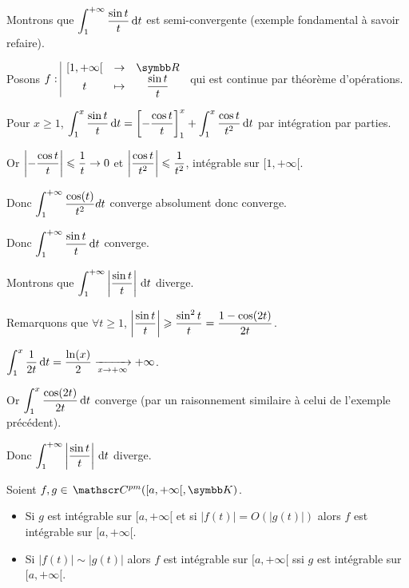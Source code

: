 \begin{exemple}
    Montrons que $\displaystyle \int_{1 }^{+ \infty   } \frac{\sin t }{t } \,\mathrm{d}t$ est semi-convergente (exemple fondamental à savoir refaire). 


    Posons $\fonction f {[1, + \infty[}{\R}{t}{\frac{\sin t}{t}}$ qui est continue par théorème d'opérations.

    Pour $x \geqslant 1$, $\displaystyle \int_{1 }^{x } \frac{\sin t}{t} \,\mathrm{d}t = \left[ - \frac{\cos t}{t} \right]_1^x + \int_1^x \frac{\cos t}{t^2} \,\mathrm{d}t$
    par intégration par parties.

    Or $\displaystyle \left| -\frac{\cos t}{t} \right| \leqslant \frac{1}{t} \to 0$ 
    et $\displaystyle \left| \frac{\cos t}{t^2} \right| \leqslant \frac{1}{t^2}$, intégrable sur $[1, + \infty[$.

    Donc $\displaystyle \int_1^{+\infty} \frac{\cos(t)}{t^2} dt$ converge absolument donc converge.

    Donc $\displaystyle \int_{1 }^{+ \infty   } \frac{\sin t }{t } \,\mathrm{d}t$ converge.


    Montrons que $\displaystyle \int_{1 }^{+ \infty   } \left| \frac{\sin t }{t } \right| \,\mathrm{d}t$ diverge.

    Remarquons que $\forall t \geqslant 1$, $\displaystyle \left| \frac{\sin t}{t} \right| \geqslant \frac{\sin^2 t}{t} = \frac{1 - \cos(2t)}{2t}$.

    $\displaystyle \int_{1}^{x } \frac 1 {2t} \,\mathrm{d}t = \frac{\ln(x)}{2} \xrightarrow[x \to + \infty   ]{} + \infty$.

    Or $\displaystyle \int_{1}^{x } \frac{\cos(2t)}{2t} \,\mathrm{d}t$ converge (par un raisonnement similaire à celui de l'exemple précédent).

    Donc $\displaystyle \int_{1 }^{+ \infty   } \left| \frac{\sin t }{t } \right| \,\mathrm{d}t$ diverge.
\end{exemple}



\begin{theoreme}{}{}
    Soient $f, g \in \mc{pm}([a, + \infty[, \K)$. 

    \begin{itemize}
        \item Si $g$ est intégrable sur $[a, + \infty[$ et si $|f(t)| = O(|g(t)|)$ alors $f$ est 
        intégrable sur $[a, + \infty[$.
        \item Si $|f(t)| \sim |g(t)|$ alors $f$ est intégrable sur $[a, + \infty[$ ssi $g$ est intégrable sur $[a, + \infty[$.
    \end{itemize}
\end{theoreme}

